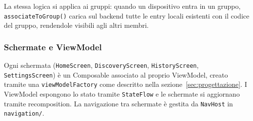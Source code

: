 La stessa logica si applica ai gruppi: quando un dispositivo entra in un gruppo, \texttt{associate\-To\-Group()} carica sul backend tutte le entry locali esistenti con il codice del gruppo, rendendole visibili agli altri membri.

\subsubsection*{Schermate e ViewModel}

Ogni schermata (\texttt{HomeScreen}, \texttt{DiscoveryScreen}, \texttt{HistoryScreen}, \texttt{SettingsScreen}) è un Composable associato al proprio ViewModel, creato tramite una \texttt{viewModelFactory} come descritto nella sezione~\ref{sec:progettazione}. I ViewModel espongono lo stato tramite \texttt{StateFlow} e le schermate si aggiornano tramite recomposition. La navigazione tra schermate è gestita da \texttt{NavHost} in \texttt{navigation/}.

\pagebreak

